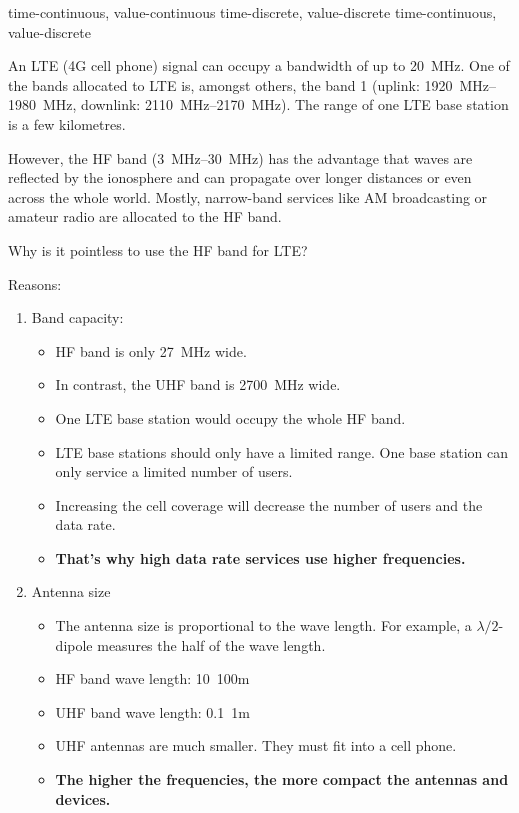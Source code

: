 \begin{solution}
	\begin{tasks}
		\task
		time-continuous, value-continuous
		\task
		time-discrete, value-discrete
		\task
		time-continuous, value-discrete
	\end{tasks}
\end{solution}

\begin{question}[subtitle={Frequency Allocation}]
	An LTE (4G cell phone) signal can occupy a bandwidth of up to \SI{20}{MHz}. One of the bands allocated to LTE is, amongst others, the band 1 (uplink: \SIrange{1920}{1980}{MHz}, downlink: \SIrange{2110}{2170}{MHz}). The range of one LTE base station is a few kilometres.
	
	However, the HF band (\SIrange{3}{30}{MHz}) has the advantage that waves are reflected by the ionosphere and can propagate over longer distances or even across the whole world. Mostly, narrow-band services like AM broadcasting or amateur radio are allocated to the HF band.
	
	Why is it pointless to use the HF band for LTE?
\end{question}

\begin{solution}
	Reasons:
	\begin{enumerate}
		\item Band capacity:
		\begin{itemize}
			\item HF band is only \SI{27}{MHz} wide.
			\item In contrast, the UHF band is \SI{2700}{MHz} wide.
			\item One LTE base station would occupy the whole HF band.
			\item LTE base stations should only have a limited range. One base station can only service a limited number of users.
			\item Increasing the cell coverage will decrease the number of users and the data rate.
			\item \textbf{That's why high data rate services use higher frequencies.}
		\end{itemize}
		\item Antenna size
		\begin{itemize}
			\item The antenna size is proportional to the wave length. For example, a $\lambda/2$-dipole measures the half of the wave length.
			\item HF band wave length: \SI{10}{100}{m}
			\item UHF band wave length: \SI{0.1}{1}{m}
			\item UHF antennas are much smaller. They must fit into a cell phone.
			\item \textbf{The higher the frequencies, the more compact the antennas and devices.}
		\end{itemize}
	\end{enumerate}
\end{solution}

